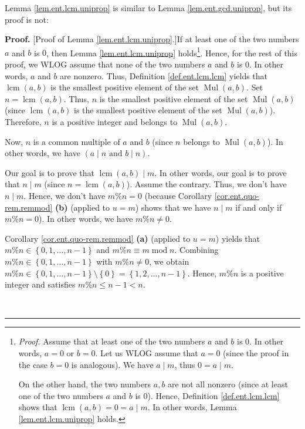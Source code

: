 \documentclass[numbers=enddot,12pt,final,onecolumn,notitlepage]{scrartcl}%
\numberwithin{exer}{subsection}
\theoremstyle{definition}
\newenvironment{proof}[1][Proof]{\noindent\textbf{#1.} }{\ \rule{0.5em}{0.5em}}
\begin{document}
Lemma \ref{lem.ent.lcm.uniprop} is similar to Lemma \ref{lem.ent.gcd.uniprop},
but its proof is not:

\begin{proof}
[Proof of Lemma \ref{lem.ent.lcm.uniprop}.]If at least one of the two numbers
$a$ and $b$ is $0$, then Lemma \ref{lem.ent.lcm.uniprop}
holds\footnote{\textit{Proof.} Assume that at least one of the two numbers $a$
and $b$ is $0$. In other words, $a=0$ or $b=0$. Let us WLOG assume that $a=0$
(since the proof in the case $b=0$ is analogous). We have $a\mid m$, thus
$0=a\mid m$.
\par
On the other hand, the two numbers $a,b$ are not all nonzero (since at least
one of the two numbers $a$ and $b$ is $0$). Hence, Definition
\ref{def.ent.lcm.lcm} shows that $\operatorname{lcm}\left(  a,b\right)
=0=a\mid m$. In other words, Lemma \ref{lem.ent.lcm.uniprop} holds.}. Hence,
for the rest of this proof, we WLOG assume that none of the two numbers $a$
and $b$ is $0$. In other words, $a$ and $b$ are nonzero. Thus, Definition
\ref{def.ent.lcm.lcm} yields that $\operatorname{lcm}\left(  a,b\right)  $ is
the smallest positive element of the set $\operatorname*{Mul}\left(
a,b\right)  $. Set $n=\operatorname{lcm}\left(  a,b\right)  $. Thus, $n$ is
the smallest positive element of the set $\operatorname*{Mul}\left(
a,b\right)  $ (since $\operatorname{lcm}\left(  a,b\right)  $ is the smallest
positive element of the set $\operatorname*{Mul}\left(  a,b\right)  $).
Therefore, $n$ is a positive integer and belongs to $\operatorname*{Mul}%
\left(  a,b\right)  $.

Now, $n$ is a common multiple of $a$ and $b$ (since $n$ belongs to
$\operatorname*{Mul}\left(  a,b\right)  $). In other words, we have $\left(
a\mid n\text{ and }b\mid n\right)  $.

Our goal is to prove that $\operatorname{lcm}\left(  a,b\right)  \mid m$. In
other words, our goal is to prove that $n\mid m$ (since $n=\operatorname{lcm}%
\left(  a,b\right)  $). Assume the contrary. Thus, we don't have $n\mid m$.
Hence, we don't have $m\%n=0$ (because Corollary \ref{cor.ent.quo-rem.remmod}
\textbf{(b)} (applied to $u=m$) shows that we have $n\mid m$ if and only if
$m\%n=0$). In other words, we have $m\%n\neq0$.

Corollary \ref{cor.ent.quo-rem.remmod} \textbf{(a)} (applied to $u=m$) yields
that $m\%n\in\left\{  0,1,\ldots,n-1\right\}  $ and $m\%n\equiv
m\operatorname{mod}n$. Combining $m\%n\in\left\{  0,1,\ldots,n-1\right\}  $
with $m\%n\neq0$, we obtain $m\%n\in\left\{  0,1,\ldots,n-1\right\}
\setminus\left\{  0\right\}  =\left\{  1,2,\ldots,n-1\right\}  $. Hence,
$m\%n$ is a positive integer and satisfies $m\%n\leq n-1<n$.


\end{proof}
\end{document}
